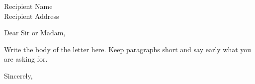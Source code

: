 \documentclass[11pt]{letter}
\begin{document}
\begin{letter}{Recipient Name \\ Recipient Address}
\opening{Dear Sir or Madam,}

Write the body of the letter here. Keep paragraphs short and say early what
you are asking for.

\closing{Sincerely,}
\end{letter}
\end{document}
